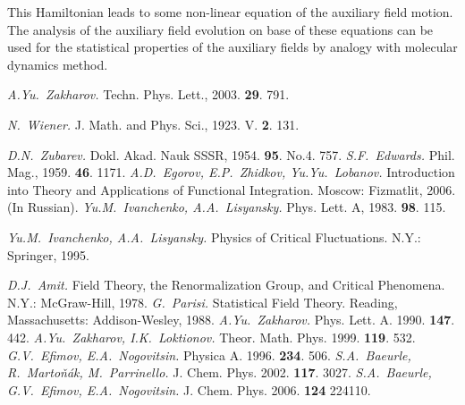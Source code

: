 \documentclass[aps,pre,preprint,floatfix,twoside,tightenlines,showpacs,
showkeys]{revtex4}
\begin{document}
This Hamiltonian leads to some non-linear equation of the auxiliary field motion. The analysis of the auxiliary field evolution on base of these equations can be used for the statistical properties of the auxiliary fields by analogy with molecular dynamics method. 


\begin{thebibliography}{99}


 {\it A.Yu.~Zakharov.} Techn. Phys. Lett., 2003. {\bf 29}. 791.

 {\it N.~Wiener.} J. Math. and Phys. Sci., 1923. V. {\bf 2}. 131.

 {\it D.N.~Zubarev.} Dokl. Akad. Nauk SSSR, 1954. {\bf 95}. No.4. 757.
%
 {\it S.F.~Edwards.}  Phil. Mag., 1959. {\bf 46}. 1171.
%
 {\it A.D.~Egorov, E.P.~Zhidkov, Yu.Yu.~Lobanov.} Introduction into Theory and Applications of Functional Integration. Moscow: Fizmatlit, 2006. (In Russian).
%
 {\it Yu.M.~Ivanchenko, A.A.~Lisyansky.} Phys. Lett. A, 1983. {\bf 98}. 115. 

 {\it Yu.M.~Ivanchenko, A.A.~Lisyansky.} Physics of Critical Fluctuations. N.Y.: Springer, 1995. 

 {\it D.J.~Amit.} Field Theory, the Renormalization Group, and Critical Phenomena. N.Y.: McGraw-Hill, 1978.%
%
 {\it G.~Parisi.} Statistical Field Theory. Reading, Massachusetts: Addison-Wesley, 1988. %
%
 {\it A.Yu.~Zakharov.}  Phys. Lett. A. 1990. {\bf 147}. 442. 
%
 {\it A.Yu.~Zakharov, I.K.~Loktionov.} Theor. Math. Phys. 1999. {\bf 119}. 532.
%
 {\it G.V.~Efimov, E.A.~Nogovitsin.} Physica A. 1996. {\bf 234}. 506.
%
 {\it S.A.~Baeurle, R.~Marto\v{n}\'ak, M.~Parrinello.} J. Chem. Phys. 2002. {\bf 117}. 3027.
%
 {\it S.A.~Baeurle, G.V.~Efimov, E.A.~Nogovitsin.} J. Chem. Phys. 2006. {\bf 124} 224110.
%
%

\end{thebibliography}
\end{document}
